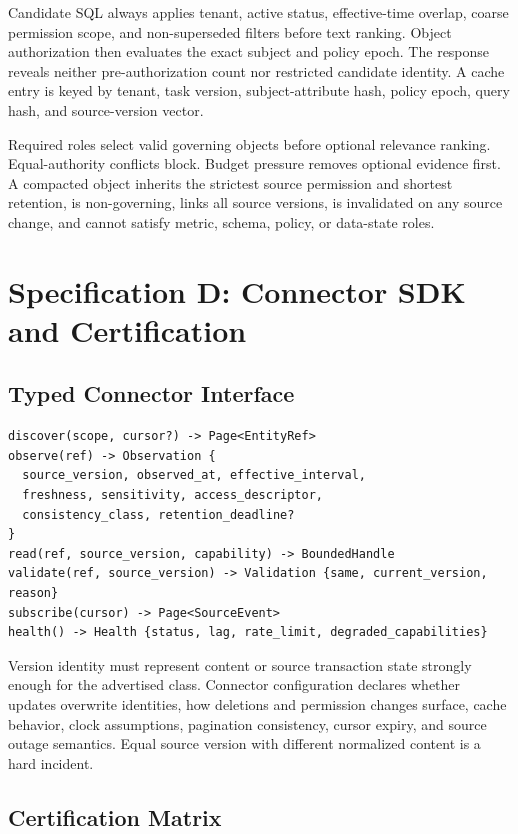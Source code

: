 \documentclass[10pt]{article}
\begin{document}
Candidate SQL always applies tenant, active status, effective-time overlap, coarse permission scope, and non-superseded filters before text ranking. Object authorization then evaluates the exact subject and policy epoch. The response reveals neither pre-authorization count nor restricted candidate identity. A cache entry is keyed by tenant, task version, subject-attribute hash, policy epoch, query hash, and source-version vector.

Required roles select valid governing objects before optional relevance ranking. Equal-authority conflicts block. Budget pressure removes optional evidence first. A compacted object inherits the strictest source permission and shortest retention, is non-governing, links all source versions, is invalidated on any source change, and cannot satisfy metric, schema, policy, or data-state roles.

\Needspace{0.55\textheight}
\section{Specification D: Connector SDK and Certification}

\subsection{Typed Connector Interface}

\begin{lstlisting}[style=contract]
discover(scope, cursor?) -> Page<EntityRef>
observe(ref) -> Observation {
  source_version, observed_at, effective_interval,
  freshness, sensitivity, access_descriptor,
  consistency_class, retention_deadline?
}
read(ref, source_version, capability) -> BoundedHandle
validate(ref, source_version) -> Validation {same, current_version, reason}
subscribe(cursor) -> Page<SourceEvent>
health() -> Health {status, lag, rate_limit, degraded_capabilities}
\end{lstlisting}

Version identity must represent content or source transaction state strongly enough for the advertised class. Connector configuration declares whether updates overwrite identities, how deletions and permission changes surface, cache behavior, clock assumptions, pagination consistency, cursor expiry, and source outage semantics. Equal source version with different normalized content is a hard incident.

\subsection{Certification Matrix}
\end{document}
